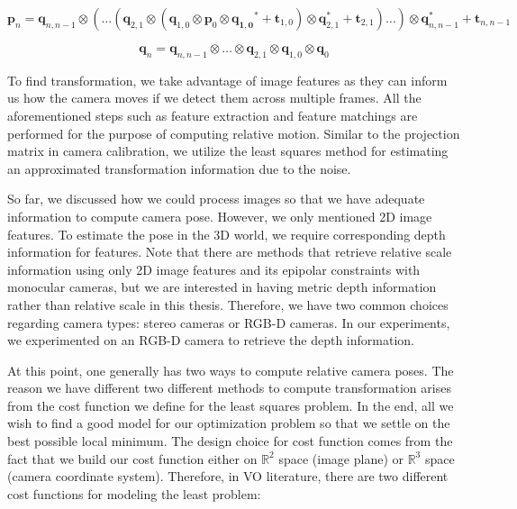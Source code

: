 \documentclass[a4paper]{report}
\numberwithin{figure}{section}
\newcommand{\R}{\mathbb{R}}
\begin{document}
\begin{equation}
  \mathbf{p}_{n} = 
  \mathbf{q}_{n, n-1} \otimes (\dots
  (\mathbf{q}_{2,1} \otimes
  (\mathbf{q}_{1,0} \otimes \mathbf{p}_0 \otimes \mathbf{q_{1,0}}^* + \mathbf{t}_{1,0})
  \otimes \mathbf{q}_{2,1}^* + \mathbf{t}_{2,1})
  \dots) \otimes \mathbf{q}_{n, n-1}^* +\mathbf{t}_{n, n-1} 
\end{equation}

\begin{equation}
  \mathbf{q}_{n} = 
  \mathbf{q}_{n,n-1} \otimes \dots \otimes \mathbf{q}_{2,1} \otimes \mathbf{q}_{1,0} \otimes \mathbf{q}_{0} 
\end{equation}

To find transformation, we take advantage of image features as they can inform 
us how the camera moves if we detect them across multiple frames.  All the 
aforementioned steps such as feature extraction and feature matchings are 
performed for the purpose of computing relative motion. Similar to the 
projection 
matrix in camera calibration, we utilize the least squares 
method for estimating an approximated transformation information due to the 
noise. 


So far, we discussed how we could process images so that we have adequate 
information to compute camera pose. However, we only mentioned 2D image 
features. To estimate the pose in the 3D world, we require corresponding depth 
information for features. Note that there are methods that retrieve relative 
scale information using only 2D image features and its epipolar constraints 
with monocular cameras, but we are interested in having metric depth 
information rather than relative scale in this thesis. Therefore, we have two 
common choices regarding camera types: stereo cameras or RGB-D cameras. In our 
experiments, we experimented on an RGB-D camera to retrieve the depth 
information.

At this point, one generally has two ways to compute relative camera poses.  
The reason we have different two different methods to compute transformation 
arises 
from the cost function we define for the least squares problem. In the end, 
all we wish to find a good model for our optimization problem so that we 
settle on the best possible local minimum.  The design choice for cost 
function comes from the fact that we build our cost function either on $\R^2$ 
space (image plane) or $\R^3$ space (camera coordinate system).  Therefore, in 
VO literature, there are two different cost functions for modeling the least 
problem:
\end{document}
